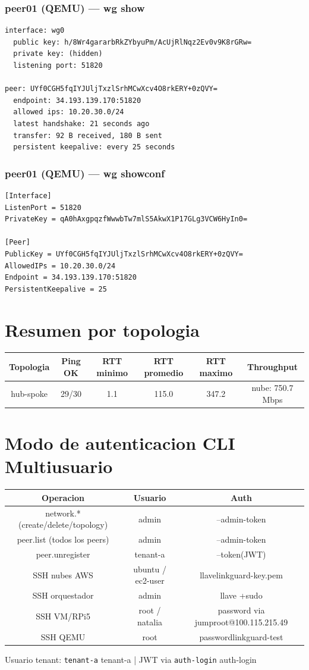 \documentclass[11pt,a4paper]{article}
\begin{document}
\subsubsection*{peer01 (QEMU) — wg show}
\begin{lstlisting}
interface: wg0
  public key: h/8Wr4gararbRkZYbyuPm/AcUjRlNqz2Ev0v9K8rGRw=
  private key: (hidden)
  listening port: 51820

peer: UYf0CGH5fqIYJUljTxzlSrhMCwXcv4O8rkERY+0zQVY=
  endpoint: 34.193.139.170:51820
  allowed ips: 10.20.30.0/24
  latest handshake: 21 seconds ago
  transfer: 92 B received, 180 B sent
  persistent keepalive: every 25 seconds

\end{lstlisting}

\subsubsection*{peer01 (QEMU) — wg showconf}
\begin{lstlisting}
[Interface]
ListenPort = 51820
PrivateKey = qA0hAxgpqzfWwwbTw7mlS5AkwX1P17GLg3VCW6HyIn0=

[Peer]
PublicKey = UYf0CGH5fqIYJUljTxzlSrhMCwXcv4O8rkERY+0zQVY=
AllowedIPs = 10.20.30.0/24
Endpoint = 34.193.139.170:51820
PersistentKeepalive = 25

\end{lstlisting}

\section{Resumen por topologia}
\begin{longtable}{|c|c|c|c|c|c|}
\hline
Topologia & Ping OK & RTT minimo & RTT promedio & RTT maximo & Throughput \\ \hline
hub-spoke & 29/30 & 1.1 & 115.0 & 347.2 & nube: 750.7 Mbps \\ \hline
\end{longtable}

\section{Modo de autenticacion CLI Multiusuario}
\begin{longtable}{|c|c|c|}
\hline
Operacion & Usuario & Auth \\ \hline
network.* (create/delete/topology) & admin & --admin-token \\ \hline
peer.list (todos los peers) & admin & --admin-token \\ \hline
peer.unregister & tenant-a & --token(JWT) \\ \hline
SSH nubes AWS & ubuntu / ec2-user & llavelinkguard-key.pem \\ \hline
SSH orquestador & admin & llave +sudo \\ \hline
SSH VM/RPi5 & root / natalia & password via jumproot@100.115.215.49 \\ \hline
SSH QEMU & root & passwordlinkguard-test \\ \hline
\end{longtable}

Usuario tenant:  \texttt{tenant-a} tenant-a  | JWT via  \texttt{auth-login} auth-login\\
\end{document}
